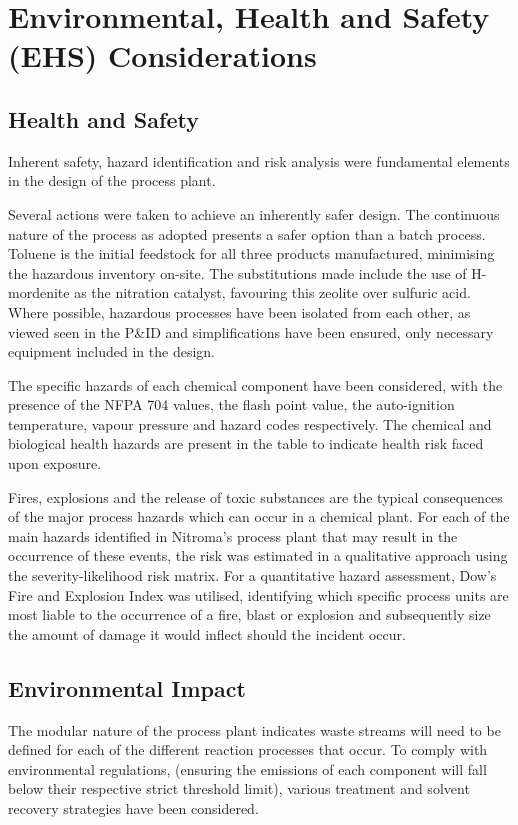 \section{Environmental, Health and Safety (EHS) Considerations}
\label{sec:ehs}
\subsection{Health and Safety}

Inherent safety, hazard identification and risk analysis were fundamental elements in the design of the process plant. 

Several actions were taken to achieve an inherently safer design. The continuous nature of the process as adopted presents a safer option than a batch process. Toluene is the initial feedstock for all three products manufactured, minimising the hazardous inventory on-site. The substitutions made include the use of H-mordenite as the nitration catalyst, favouring this zeolite over sulfuric acid. Where possible, hazardous processes have been isolated from each other, as viewed seen in the P&ID and simplifications have been ensured, only necessary equipment included in the design. 

The specific hazards of each chemical component have been considered, with the presence of the NFPA 704 values, the flash point value, the auto-ignition temperature, vapour pressure and hazard codes respectively. The chemical and biological health hazards are present in the table to indicate health risk faced upon exposure.  

Fires, explosions and the release of toxic substances are the typical consequences of the major process hazards which can occur in a chemical plant.  %
For each of the main hazards identified in Nitroma's process plant that may result in the occurrence of these events, the risk was estimated in a qualitative approach using the severity-likelihood risk matrix. For a quantitative hazard assessment, Dow's Fire and Explosion Index was utilised, identifying which specific process units are most liable to the occurrence of a fire, blast or explosion and subsequently size the amount of damage it would inflect should the incident occur. 



\subsection{Environmental Impact}

The modular nature of the process plant indicates waste streams will need to be defined for each of the different reaction processes that occur. To comply with environmental regulations, (ensuring the emissions of each component will fall below their respective strict threshold limit), various treatment and solvent recovery strategies have been considered. 